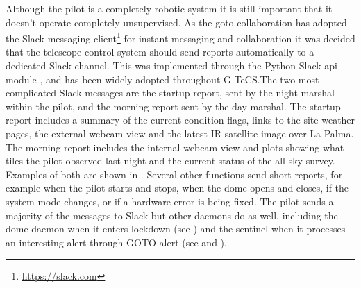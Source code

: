 \begin{colsection}
\begin{colsection}
Although the pilot is a completely robotic system it is still important that it doesn't operate completely unsupervised. As the \gls{goto} collaboration has adopted the Slack messaging client\footnote{\url{https://slack.com}} for instant messaging and collaboration it was decided that the telescope control system should send reports automatically to a dedicated Slack channel. This was implemented through the Python Slack \gls{api} module , and has been widely adopted throughout G-TeCS.\@ The two most complicated Slack messages are the startup report, sent by the night marshal within the pilot, and the morning report sent by the day marshal. The startup report includes a summary of the current condition flags, links to the site weather pages, the external webcam view and the latest IR satellite image over La Palma. The morning report includes the internal webcam view and plots showing what tiles the pilot observed last night and the current status of the all-sky survey. Examples of both are shown in . Several other functions send short reports, for example when the pilot starts and stops, when the dome opens and closes, if the system mode changes, or if a hardware error is being fixed. The pilot sends a majority of the messages to Slack but other daemons do as well, including the dome daemon when it enters lockdown (see ) and the sentinel when it processes an interesting alert through GOTO-alert (see  and ).


\end{colsection}
\end{colsection}
